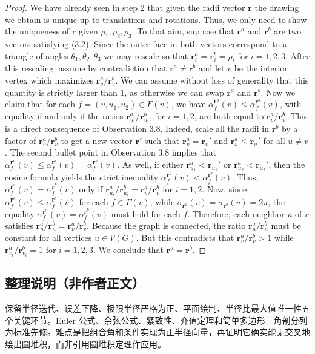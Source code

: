 \documentclass[UTF8,11pt]{ctexart}
\theoremstyle{definition}
\begin{document}
\begin{proof}
We have already seen in step 2 that given the radii vector $\mathbf r$ the drawing we obtain is unique up to translations and rotations. Thus, we only need to show the uniqueness of $\mathbf r$ given $\rho_1,\rho_2,\rho_3$.
To that aim, suppose that $\mathbf r^a$ and $\mathbf r^b$ are two vectors satisfying (3.2). Since the outer face in both vectors correspond to a triangle of angles $\theta_1,\theta_2,\theta_3$ we may rescale so that $\mathbf r_i^a=\mathbf r_i^b=\rho_i$ for $i=1,2,3$. After this rescaling, assume by contradiction that $\mathbf r^a\ne\mathbf r^b$ and let $v$ be the interior vertex which maximizes $\mathbf r_v^a/\mathbf r_v^b$. We can assume without loss of generality that this quantity is strictly larger than $1$, as otherwise we can swap $\mathbf r^a$ and $\mathbf r^b$.
Now we claim that for each $f=(v,u_1,u_2)\in F(v)$, we have $\alpha_f^{\mathbf r^a}(v)\le\alpha_f^{\mathbf r^b}(v)$, with equality if and only if the ratios $\mathbf r_{u_i}^a/\mathbf r_{u_i}^b$, for $i=1,2$, are both equal to $\mathbf r_v^a/\mathbf r_v^b$. This is a direct consequence of Observation 3.8.
Indeed, scale all the radii in $\mathbf r^b$ by a factor of $\mathbf r_v^a/\mathbf r_v^b$ to get a new vector $\mathbf r'$ such that $\mathbf r_v^a=\mathbf r_v'$ and $\mathbf r_u^a\le\mathbf r_u'$ for all $u\ne v$. The second bullet point in Observation 3.8 implies that $\alpha_f^{\mathbf r^a}(v)\le\alpha_f^{\mathbf r'}(v)=\alpha_f^{\mathbf r^b}(v)$. As well, if either $\mathbf r_{u_1}^a<\mathbf r_{u_1}'$ or $\mathbf r_{u_2}^a<\mathbf r_{u_2}'$, then the cosine formula yields the strict inequality $\alpha_f^{\mathbf r^a}(v)<\alpha_f^{\mathbf r'}(v)$. Thus, $\alpha_f^{\mathbf r^a}(v)=\alpha_f^{\mathbf r^b}(v)$ only if $\mathbf r_{u_i}^a/\mathbf r_{u_i}^b=\mathbf r_v^a/\mathbf r_v^b$ for $i=1,2$.
Now, since $\alpha_f^{\mathbf r^a}(v)\le\alpha_f^{\mathbf r^b}(v)$ for each $f\in F(v)$, while $\sigma_{\mathbf r^a}(v)=\sigma_{\mathbf r^b}(v)=2\pi$, the equality $\alpha_f^{\mathbf r^a}(v)=\alpha_f^{\mathbf r^b}(v)$ must hold for each $f$. Therefore, each neighbor $u$ of $v$ satisfies $\mathbf r_u^a/\mathbf r_u^b=\mathbf r_v^a/\mathbf r_v^b$.
Because the graph is connected, the ratio $\mathbf r_u^a/\mathbf r_u^b$ must be constant for all vertices $u\in V(G)$. But this contradicts that $\mathbf r_v^a/\mathbf r_v^b>1$ while $\mathbf r_{v_i}^a/\mathbf r_{v_i}^b=1$ for $i=1,2,3$. We conclude that $\mathbf r^a=\mathbf r^b$.
\end{proof}
\subsection*{整理说明（非作者正文）}
保留半径迭代、误差下降、极限半径严格为正、平面绘制、半径比最大值唯一性五个关键环节。Euler 公式、余弦公式、紧致性、介值定理和简单多边形三角剖分列为标准先修。难点是把组合角和条件实现为正半径向量，再证明它确实能无交叉地绘出圆堆积，而非引用圆堆积定理作应用。
\end{document}
